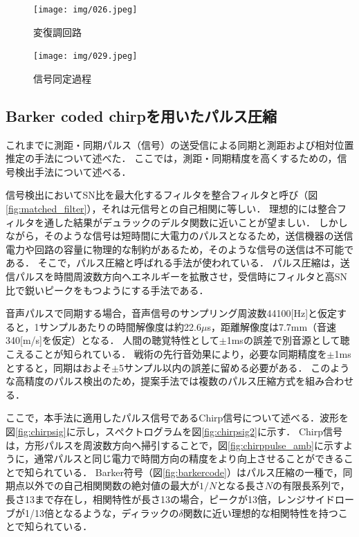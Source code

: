 \begin{figure}[p]
  \centering
  \texttt{[image: img/026.jpeg]}
  \caption{変復調回路}\label{fig:henpuku}
\end{figure}


\begin{figure}[p]
  \centering
  \texttt{[image: img/029.jpeg]}
  \caption{信号同定過程}\label{fig:shousai}
\end{figure}




\clearpage

\subsection{Barker coded chirpを用いたパルス圧縮}

これまでに測距・同期パルス（信号）の送受信による同期と測距および相対位置推定の手法について述べた．
ここでは，測距・同期精度を高くするための，信号検出手法について述べる．

信号検出においてSN比を最大化するフィルタを整合フィルタと呼び（図\ref{fig:matched_filter}），それは元信号との自己相関に等しい\cite{seigoufilter}．
理想的には整合フィルタを通した結果がデュラックのデルタ関数に近いことが望ましい．
しかしながら，そのような信号は短時間に大電力のパルスとなるため，送信機器の送信電力や回路の容量に物理的な制約があるため，そのような信号の送信は不可能である．
そこで，パルス圧縮と呼ばれる手法が使われている\cite{pulsecompress}．
パルス圧縮は，送信パルスを時間周波数方向へエネルギーを拡散させ，受信時にフィルタと高SN比で鋭いピークをもつようにする手法である．

音声パルスで同期する場合，音声信号のサンプリング周波数44100[Hz]と仮定すると，1サンプルあたりの時間解像度は約22.6$\mu$s，距離解像度は7.7mm（音速340[m/s]を仮定）となる．
人間の聴覚特性として$\pm$1msの誤差で別音源として聴こえることが知られている．
戦術の先行音効果により，必要な同期精度を$\pm$1msとすると，同期はおよそ$\pm$5サンプル以内の誤差に留める必要がある．
このような高精度のパルス検出のため，提案手法では複数のパルス圧縮方式を組み合わせる．

ここで，本手法に適用したパルス信号であるChirp信号について述べる．波形を図\ref{fig:chirpsig}に示し，スぺクトログラムを図\ref{fig:chirpsig2}に示す．
Chirp信号は，方形パルスを周波数方向へ掃引することで，図\ref{fig:chirppulse_amb}に示すように，通常パルスと同じ電力で時間方向の精度をより向上させることができることで知られている．
Barker符号（図\ref{fig:barkercode}）はパルス圧縮の一種で，同期点以外での自己相関関数の絶対値の最大が$1/N$となる長さ$N$の有限長系列で，長さ13まで存在し，相関特性が長さ13の場合，ピークが13倍，レンジサイドローブが1/13倍となるような，ディラックの$\delta$関数に近い理想的な相関特性を持つことで知られている．

